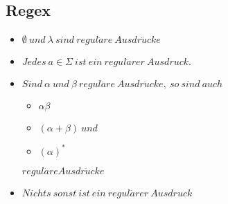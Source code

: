 \documentclass[9pt, a4paper]{article}
\begin{document}
\subsection{Regex}
\begin{itemize}
	\item $\emptyset\ und\ \lambda\ sind\ regul\ddot{a}re\ Ausdr\ddot{u}cke$
	\item $Jedes\ a \in \Sigma\ ist\ ein\ regul\ddot{a}rer\ Ausdruck.$
	\item $Sind\ \alpha\ und\ \beta\ regul\ddot{a}re\ Ausdr\ddot{u}cke,\ so\ sind\ auch$
	  	\begin{itemize}
			\item $\alpha\beta$
			\item $(\alpha + \beta)\ und$
			\item $(\alpha)^*$
		\end{itemize}
		$regul\ddot{a}re Ausdr\ddot{u}cke$
	\item $Nichts\ sonst\ ist\ ein\ regul\ddot{a}rer\ Ausdruck$
\end{itemize}
\end{document}
